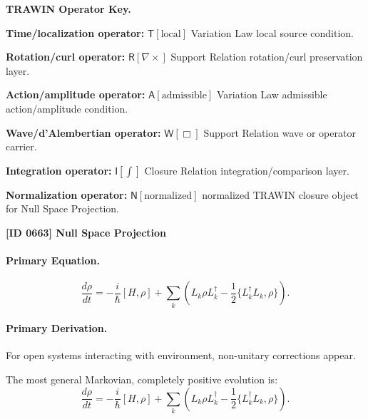 \par\vspace{0.45\baselineskip}
\noindent\begin{minipage}[t]{\linewidth}
\begingroup
\small
\raggedright
\textbf{TRAWIN Operator Key.}\par
\noindent\textbf{Time/localization operator:} $\mathsf{T}\!\left[\mathrm{local}\right]$ Variation Law local source condition.\par
\noindent\textbf{Rotation/curl operator:} $\mathsf{R}\!\left[\nabla\times\right]$ Support Relation rotation/curl preservation layer.\par
\noindent\textbf{Action/amplitude operator:} $\mathsf{A}\!\left[\mathrm{admissible}\right]$ Variation Law admissible action/amplitude condition.\par
\noindent\textbf{Wave/d'Alembertian operator:} $\mathsf{W}\!\left[\Box\right]$ Support Relation wave or operator carrier.\par
\noindent\textbf{Integration operator:} $\mathsf{I}\!\left[\int\right]$ Closure Relation integration/comparison layer.\par
\noindent\textbf{Normalization operator:} $\mathsf{N}\!\left[\mathrm{normalized}\right]$ normalized TRAWIN closure object for Null Space Projection.\par
\endgroup
\end{minipage}

\clearpage
\noindent\textbf{[ID 0663] Null Space Projection}\par
\vspace{0.35em}
\paragraph{Primary Equation.}
\begin{equation}
\frac{d\rho}{dt}
=
-\frac{i}{\hbar}[H,\rho]
+
\sum_k
\left(
L_k \rho L_k^\dagger
-
\frac{1}{2}
\{L_k^\dagger L_k,\rho\}
\right).
\end{equation}

\paragraph{Primary Derivation.}
For open systems interacting with environment, non-unitary corrections appear.

The most general Markovian, completely positive evolution is:
\begin{equation}
\boxed{
\frac{d\rho}{dt}
=
-\frac{i}{\hbar}[H,\rho]
+
\sum_k
\left(
L_k \rho L_k^\dagger
-
\frac{1}{2}
\{L_k^\dagger L_k,\rho\}
\right).
}
\end{equation}

